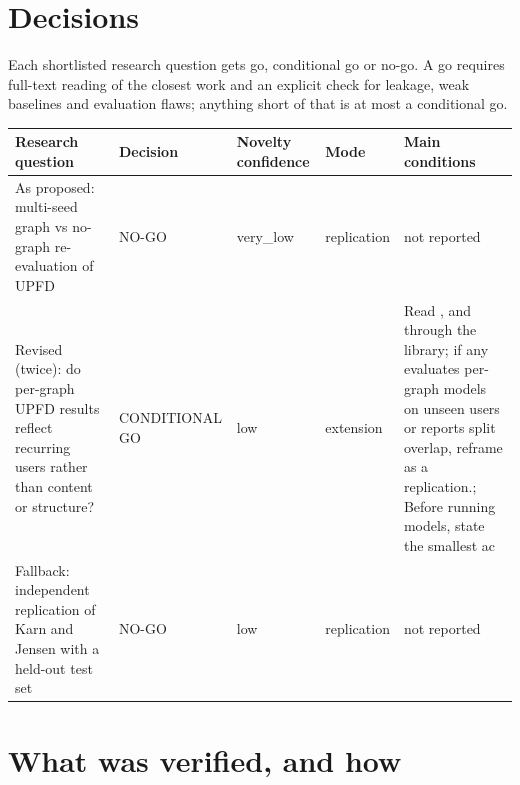 \documentclass[11pt,a4paper]{article}
\begin{document}
\section{Decisions}

Each shortlisted research question gets go, conditional go or no-go. A go requires full-text reading of the closest work and an explicit check for leakage, weak baselines and evaluation flaws; anything short of that is at most a conditional go.

{\small
\begin{longtable}{>{\raggedright\arraybackslash}p{}>{\raggedright\arraybackslash}p{}>{\raggedright\arraybackslash}p{}>{\raggedright\arraybackslash}p{}>{\raggedright\arraybackslash}p{}}
\toprule
\textbf{Research question} & \textbf{Decision} & \textbf{Novelty confidence} & \textbf{Mode} & \textbf{Main conditions} \\
\midrule
\endhead
As proposed: multi-seed graph vs no-graph re-evaluation of UPFD & NO-GO & very\_low & replication & not reported \\
Revised (twice): do per-graph UPFD results reflect recurring users rather than content or structure? & CONDITIONAL GO & low & extension & Read \cite{rai2025hypergraph}, \cite{rai2025attention} and \cite{bryla2026networks} through the library; if any evaluates per-graph models on unseen users or reports split overlap, reframe as a replication.; Before running models, state the smallest ac \\
Fallback: independent replication of Karn and Jensen with a held-out test set & NO-GO & low & replication & not reported \\
\bottomrule
\end{longtable}
}

\section{What was verified, and how}
\end{document}
